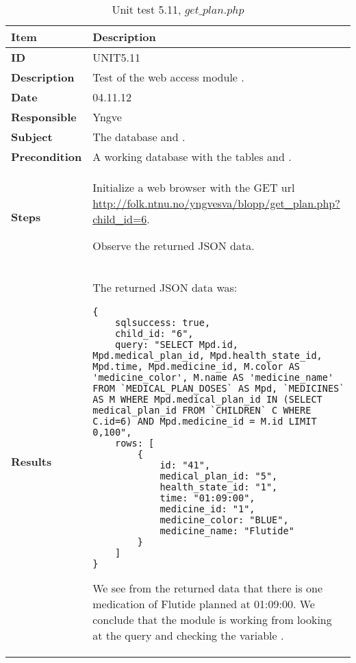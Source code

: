 \begin{table} %
	\begin{center}
		\begin{tabular}{|p{3.0cm}|p{14.0cm}|}
			\hline
			\bf{Item} & \bf{Description}\\
			\hline
			\bf{ID} & UNIT5.11\\
			\bf{Description} & Test of the web access module \code{get\_plan.php}.\\
			\bf{Date} & 04.11.12\\
			\bf{Responsible} & Yngve\\
			\bf{Subject} & The database and \code{get\_plan.php}.\\
			\bf{Precondition} & A working database with the tables \code{MEDICAL\_PLAN\_DOSES} and \code{CHILDREN}.\\
			\bf{Steps} &
			\begin{tabulenum}
				\item Initialize a web browser with the GET url \url{http://folk.ntnu.no/yngvesva/blopp/get\_plan.php?child\_id=6}.
				\item Observe the returned JSON data.
			\end{tabulenum}\\
			\hline
			\bf{Results} & The returned JSON data was:
\begin{lstlisting}[caption=Returned JSON data for \code{get\_plan.php}]
{
	sqlsuccess: true,
	child_id: "6",
	query: "SELECT Mpd.id, Mpd.medical_plan_id, Mpd.health_state_id, Mpd.time, Mpd.medicine_id, M.color AS 'medicine_color', M.name AS 'medicine_name' FROM `MEDICAL_PLAN_DOSES` AS Mpd, `MEDICINES` AS M WHERE Mpd.medical_plan_id IN (SELECT medical_plan_id FROM `CHILDREN` C WHERE C.id=6) AND Mpd.medicine_id = M.id LIMIT 0,100",
	rows: [
		{
			id: "41",
			medical_plan_id: "5",
			health_state_id: "1",
			time: "01:09:00",
			medicine_id: "1",
			medicine_color: "BLUE",
			medicine_name: "Flutide"
		}
	]
}
\end{lstlisting}
			We see from the returned data that there is one medication of
			Flutide planned at 01:09:00. We conclude that the module is
			working from looking at the query and checking the variable
			\code{sqlsuccess}.
			\\
			\hline
		\end{tabular}
	\end{center}
	\caption{Unit test 5.11, $get\_plan.php$}
	\label{tab:unit5.11}
\end{table}

